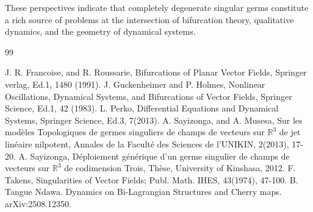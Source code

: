\documentclass[12pt]{article}
\newtheorem{remark definition}{Remark Definition}[section]
\begin{document}
These perspectives indicate that completely degenerate singular germs
constitute a rich source of problems at the intersection of bifurcation
theory, qualitative dynamics, and the geometry of dynamical systems.
\begin{thebibliography}{99}

 J. R. Francoise, and  R. Roussarie, Bifurcations of Planar Vector Fields, Springer verlag, Ed.1, 1480 (1991).
J. Guckenheimer and P. Holmes, Nonlinear Oscillations, Dynamical Systems, and Bifurcations of Vector Fields, Springer Science, Ed.1, 42 (1983).
 L. Perko, Differential Equations and Dynamical Systems, Springer Science, Ed.3, 7(2013). 
A. Sayizonga, and A. Musesa, Sur les modèles Topologiques de germes singuliers de champs de vecteurs sur $\mathbb{R}^{3}$ de jet linéaire nilpotent, Annales de la Faculté des Sciences de l'UNIKIN, 2(2013), 17-20.
 A. Sayizonga, Déploiement générique d'un germe singulier de champs de vecteurs sur $\mathbb{R}^{3}$ de codimension Trois, Thèse, University of Kinshasa, 2012.
 F. Takens, Singularities of Vector Fields; Publ. Math. IHES, 43(1974), 47-100.
 B. Tangue Ndawa.
Dynamics on Bi-Lagrangian Structures and Cherry maps.  	arXiv:2508.12350.
\end{thebibliography}
\end{document}
